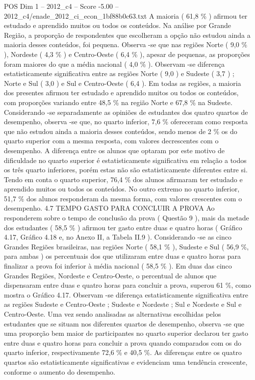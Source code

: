\begin{textsample}{POS Dim 1 – 2012\_c4 – Score -5.00 – 2012\_c4/enade\_2012\_ci\_econ\_1bf88b0c63.txt}
A maioria ( 61,8 \% ) afirmou ter estudado e aprendido muitos ou todos os conteúdos.
Na análise por Grande Região, a proporção de respondentes que escolheram a opção não estudou ainda a maioria desses conteúdos, foi pequena.
Observa -se que nas regiões Norte ( 9,0 \% ), Nordeste ( 4,3 \% ) e Centro-Oeste ( 6,4 \% ), apesar de pequenas, as proporções foram maiores do que a média nacional ( 4,0 \% ).
Observam -se diferença estatisticamente significativa entre as regiões Norte ( 9,0 ) e Sudeste ( 3,7 ) ; Norte e Sul ( 3,0 ) e Sul e Centro-Oeste ( 6,4 ).
Em todas as regiões, a maioria dos presentes afirmou ter estudado e aprendido muitos ou todos os conteúdos, com proporções variando entre 48,5 \% na região Norte e 67,8 \% na Sudeste.
Considerando -se separadamente as opiniões de estudantes dos quatro quartos de desempenho, observa -se que, no quarto inferior, 7,6 \% ofereceram como resposta que não estudou ainda a maioria desses conteúdos, sendo menos de 2 \% os do quarto superior com a mesma resposta, com valores decrescentes com o desempenho.
A diferença entre os alunos que optaram por este motivo de dificuldade no quarto superior é estatisticamente significativa em relação a todos os três quarto inferiores, porém estas não são estatisticamente diferentes entre si.
Tendo em conta o quarto superior, 76,4 \% dos alunos afirmaram ter estudado e aprendido muitos ou todos os conteúdos.
No outro extremo no quarto inferior, 51,7 \% dos alunos responderam da mesma forma, com valores crescentes com o desempenho. 4.7 TEMPO GASTO PARA CONCLUIR A PROVA Ao responderem sobre o tempo de conclusão da prova ( Questão 9 ), mais da metade dos estudantes ( 58,5 \% ) afirmou ter gasto entre duas e quatro horas ( Gráfico 4.17, Gráfico 4.18 e, no Anexo II, a Tabela II.9 ).
Considerando -se as cinco Grandes Regiões brasileiras, nas regiões Norte ( 58,1 \% ), Sudeste e Sul ( 56,9 \%, para ambas ) os percentuais dos que utilizaram entre duas e quatro horas para finalizar a prova foi inferior à média nacional ( 58,5 \% ).
Em duas das cinco Grandes Regiões, Nordeste e Centro-Oeste, o percentual de alunos que dispensaram entre duas e quatro horas para concluir a prova, superou 61 \%, como mostra o Gráfico 4.17.
Observam -se diferença estatisticamente significativa entre as regiões Sudeste e Centro-Oeste ; Sudeste e Nordeste ; Sul e Nordeste e Sul e Centro-Oeste.
Uma vez sendo analisadas as alternativas escolhidas pelos estudantes que se situam nos diferentes quartos de desempenho, observa -se que uma proporção bem maior de participantes no quarto superior declarou ter gasto entre duas e quatro horas para concluir a prova quando comparados com os do quarto inferior, respectivamente 72,6 \% e 40,5 \%.
As diferenças entre os quatro quartos são estatisticamente significativas e evidenciam uma tendência crescente, conforme o aumento do desempenho.

\end{textsample}
